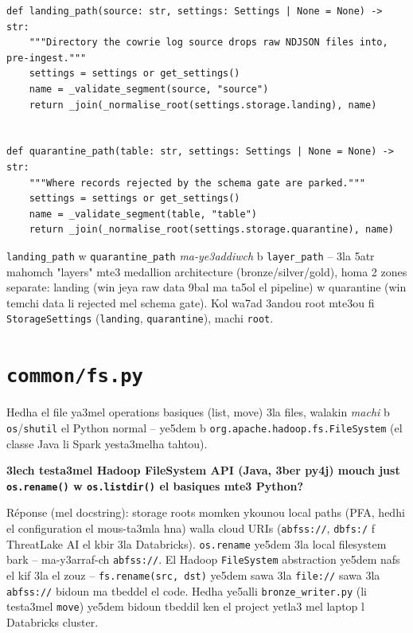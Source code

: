 \documentclass[11pt,a4paper]{report}
\DeclareRobustCommand{\code}[1]{\texttt{#1}}
\DeclareRobustCommand{\file}[1]{\texttt{\color{amber}#1}}
\begin{document}
\begin{lstlisting}[style=pystyle]
def landing_path(source: str, settings: Settings | None = None) -> str:
    """Directory the cowrie log source drops raw NDJSON files into, pre-ingest."""
    settings = settings or get_settings()
    name = _validate_segment(source, "source")
    return _join(_normalise_root(settings.storage.landing), name)


def quarantine_path(table: str, settings: Settings | None = None) -> str:
    """Where records rejected by the schema gate are parked."""
    settings = settings or get_settings()
    name = _validate_segment(table, "table")
    return _join(_normalise_root(settings.storage.quarantine), name)
\end{lstlisting}

\code{landing\_path} w \code{quarantine\_path} \emph{ma-ye3addiwch} b
\code{layer\_path} -- 3la 5atr mahomch "layers" mte3 medallion architecture
(bronze/silver/gold), homa 2 zones separate: landing (win jeya raw data 9bal
ma ta5ol el pipeline) w quarantine (win temchi data li rejected mel schema
gate). Kol wa7ad 3andou root mte3ou fi \code{StorageSettings} (\code{landing},
\code{quarantine}), machi \code{root}.

\section{\file{common/fs.py}}

Hedha el file ya3mel operations basiques (list, move) 3la files, walakin
\emph{machi} b \code{os}/\code{shutil} el Python normal -- ye5dem b
\code{org.apache.hadoop.fs.FileSystem} (el classe Java li Spark yesta3melha
tahtou).

\begin{soual}
\textbf{3lech testa3mel Hadoop FileSystem API (Java, 3ber py4j) mouch just
\code{os.rename()} w \code{os.listdir()} el basiques mte3 Python?}

Réponse (mel docstring): storage roots momken ykounou local paths (PFA,
hedhi el configuration el mous-ta3mla hna) walla cloud URIs (\code{abfss://},
\code{dbfs:/} f ThreatLake AI el kbir 3la Databricks). \code{os.rename}
ye5dem 3la local filesystem bark -- ma-y3arraf-ch \code{abfss://}. El
Hadoop \code{FileSystem} abstraction ye5dem nafs el kif 3la el zouz --
\code{fs.rename(src, dst)} ye5dem sawa 3la \code{file://} sawa 3la
\code{abfss://} bidoun ma tbeddel el code. Hedha ye5alli \code{bronze\_writer.py}
(li testa3mel \code{move}) ye5dem bidoun tbeddil ken el project yetla3 mel
laptop l Databricks cluster.
\end{soual}
\end{document}
